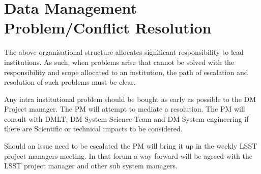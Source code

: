 \section{Data Management Problem/Conflict Resolution }
The above organisational structure allocates significant responsibility to lead institutions.  As such, when problems arise that cannot be solved with the responsibility and scope allocated to an institution, the path of escalation and resolution of such problems must be clear. 

Any intra institutional problem should be bought as early as possible to the DM Project manager. The PM will attempt to mediate a resolution. The PM will consult with DMLT, DM System Science Team and DM System engineering if there are Scientific or technical impacts to be considered. 

Should an issue need to be escalated the PM will bring it up in the weekly LSST project managers meeting. 
In that forum a way forward will be agreed with the LSST project manager and other sub system managers.




